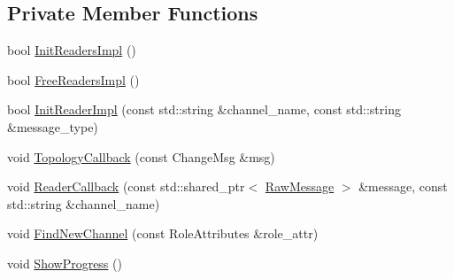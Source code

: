 \subsection*{Private Member Functions}
\begin{DoxyCompactItemize}
\item 
bool \hyperlink{classapollo_1_1cyber_1_1record_1_1Recorder_a01f8010c7d771c1d02d5376d316bb19b}{Init\-Readers\-Impl} ()
\item 
bool \hyperlink{classapollo_1_1cyber_1_1record_1_1Recorder_ae4dbb4253601d889d293cc34a19cc924}{Free\-Readers\-Impl} ()
\item 
bool \hyperlink{classapollo_1_1cyber_1_1record_1_1Recorder_a523440fbf66cb275580715cb14c92259}{Init\-Reader\-Impl} (const std\-::string \&channel\-\_\-name, const std\-::string \&message\-\_\-type)
\item 
void \hyperlink{classapollo_1_1cyber_1_1record_1_1Recorder_af12fe97b5f97f298c12d3ef5eddf93d0}{Topology\-Callback} (const Change\-Msg \&msg)
\item 
void \hyperlink{classapollo_1_1cyber_1_1record_1_1Recorder_abac0d8d87a1db4574db9d1e7e67c8be1}{Reader\-Callback} (const std\-::shared\-\_\-ptr$<$ \hyperlink{structapollo_1_1cyber_1_1message_1_1RawMessage}{Raw\-Message} $>$ \&message, const std\-::string \&channel\-\_\-name)
\item 
void \hyperlink{classapollo_1_1cyber_1_1record_1_1Recorder_a1b44f0938e97b74ab29dfb543cfd0bbc}{Find\-New\-Channel} (const Role\-Attributes \&role\-\_\-attr)
\item 
void \hyperlink{classapollo_1_1cyber_1_1record_1_1Recorder_acff5ebb09184b08346199287aef8d099}{Show\-Progress} ()
\end{DoxyCompactItemize}
